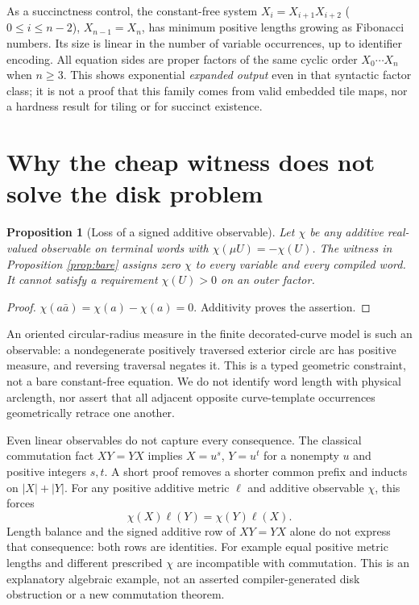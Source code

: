 \documentclass[11pt]{article}
\newtheorem{proposition}{Proposition}
\begin{document}
As a succinctness control, the constant-free system
$X_i=X_{i+1}X_{i+2}$ ($0\leq i\leq n-2$), $X_{n-1}=X_n$, has minimum
positive lengths growing as Fibonacci numbers. Its size is linear in the
number of variable occurrences, up to identifier encoding. All equation sides
are proper factors of the same cyclic order $X_0\cdots X_n$ when $n\geq3$.
This shows exponential \emph{expanded output} even in that syntactic factor
class; it is not a proof that this family comes from valid embedded tile maps,
nor a hardness result for tiling or for succinct existence.

\section{Why the cheap witness does not solve the disk problem}

\begin{proposition}[Loss of a signed additive observable]\label{prop:charge}
Let $\chi$ be any additive real-valued observable on terminal words with
$\chi(\mu U)=-\chi(U)$. The witness in Proposition \ref{prop:bare} assigns
zero $\chi$ to every variable and every compiled word.
It cannot satisfy a requirement $\chi(U)>0$ on an outer factor.
\end{proposition}

\begin{proof}
$\chi(a\bar a)=\chi(a)-\chi(a)=0$. Additivity proves the assertion.
\end{proof}

An oriented circular-radius measure in the finite decorated-curve model is
such an observable: a nondegenerate positively traversed exterior circle arc
has positive measure, and reversing traversal negates it. This is a typed
geometric constraint, not a bare constant-free equation. We do not identify
word length with physical arclength, nor assert that all adjacent opposite
curve-template occurrences geometrically retrace one another.

Even linear observables do not capture every consequence. The classical
commutation fact $XY=YX$ implies $X=u^s$, $Y=u^t$ for a nonempty $u$ and
positive integers $s,t$. A short proof removes a shorter common prefix and
inducts on $|X|+|Y|$. For any positive additive metric $\ell$ and additive
observable $\chi$, this forces
\[
 \chi(X)\ell(Y)=\chi(Y)\ell(X).
\]
Length balance and the signed additive row of $XY=YX$ alone do not express
that consequence: both rows are identities. For example equal positive
metric lengths and different prescribed $\chi$ are incompatible with
commutation. This is an explanatory algebraic example, not an asserted
compiler-generated disk obstruction or a new commutation theorem.
\end{document}
